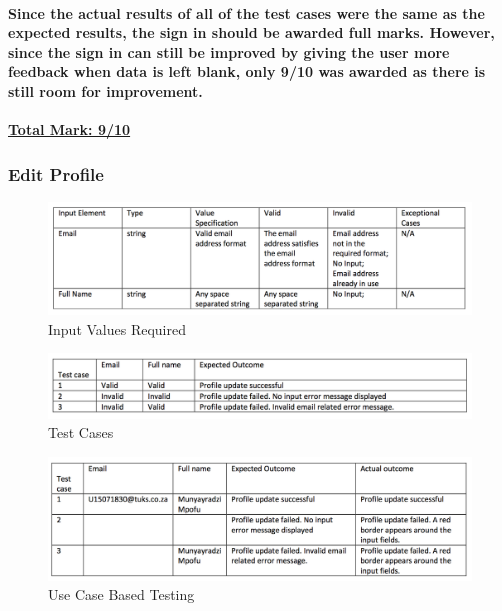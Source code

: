 \documentclass[english]{article}
\begin{document}
\paragraph{Since the actual results of all of the test cases were the same as the expected results, the sign in should be awarded full marks. However, since the sign in can still be improved by giving the user more feedback when data is left blank, only 9/10 was awarded as there is still room for improvement.\newline}
\textbf{\underline{Total Mark: 9/10}}

\subsubsection{Edit Profile}

\begin{figure}[H]
\centering
\includegraphics[width=1.0\textwidth]{editprofile_input_values_required}
\caption{Input Values Required}
\end{figure}

\begin{figure}[H]
\centering
\includegraphics[width=1.0\textwidth]{editprofile_test_cases}
\caption{Test Cases}
\end{figure}

\begin{figure}[H]
\centering
\includegraphics[width=1.0\textwidth]{use_case_based_testing_editprofile}
\caption{Use Case Based Testing}
\end{figure}
\end{document}
